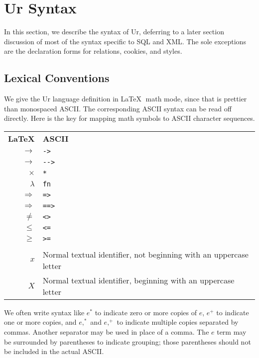 \documentclass{article}
\newcommand{\cd}[1]{\texttt{#1}}
\begin{document}
\section{Ur Syntax}

In this section, we describe the syntax of Ur, deferring to a later section discussion of most of the syntax specific to SQL and XML.  The sole exceptions are the declaration forms for relations, cookies, and styles.

\subsection{Lexical Conventions}

We give the Ur language definition in \LaTeX $\;$ math mode, since that is prettier than monospaced ASCII.  The corresponding ASCII syntax can be read off directly.  Here is the key for mapping math symbols to ASCII character sequences.

\begin{center}
  \begin{tabular}{rl}
    \textbf{\LaTeX} & \textbf{ASCII} \\
    $\to$ & \cd{->} \\
    $\longrightarrow$ & \cd{-{}->} \\
    $\times$ & \cd{*} \\
    $\lambda$ & \cd{fn} \\
    $\Rightarrow$ & \cd{=>} \\
    $\Longrightarrow$ & \cd{==>} \\
    $\neq$ & \cd{<>} \\
    $\leq$ & \cd{<=} \\
    $\geq$ & \cd{>=} \\
    \\
    $x$ & Normal textual identifier, not beginning with an uppercase letter \\
    $X$ & Normal textual identifier, beginning with an uppercase letter \\
  \end{tabular}
\end{center}

We often write syntax like $e^*$ to indicate zero or more copies of $e$, $e^+$ to indicate one or more copies, and $e,^*$ and $e,^+$ to indicate multiple copies separated by commas.  Another separator may be used in place of a comma.  The $e$ term may be surrounded by parentheses to indicate grouping; those parentheses should not be included in the actual ASCII.
\end{document}
